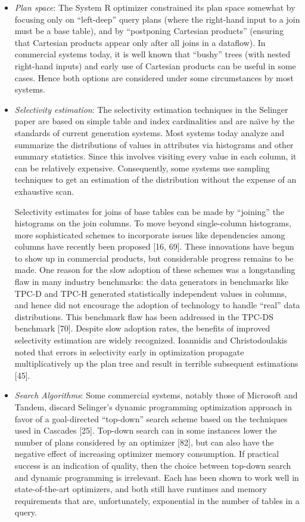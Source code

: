 \documentclass[b5paper,11pt,twoside,openright]{book}
\begin{document}
\begin{itemize}
\item
  \emph{Plan space}: The System R optimizer constrained its plan space
  somewhat by focusing only on ``left-deep'' query plans (where the
  right-hand input to a join must be a base table), and by ``postponing
  Cartesian products'' (ensuring that Cartesian products appear only
  after all joins in a dataflow). In commercial systems today, it is
  well known that ``bushy'' trees (with nested right-hand inputs) and
  early use of Cartesian products can be useful in some cases. Hence
  both options are considered under some circumstances by most systems.
\item
  \emph{Selectivity estimation}: The selectivity estimation techniques
  in the Selinger paper are based on simple table and index
  cardinalities and are na{\"\i}ve by the standards of current generation
  systems. Most systems today analyze and summarize the distributions of
  values in attributes via histograms and other summary statistics.
  Since this involves visiting every value in each column, it can be
  relatively expensive. Consequently, some systems use sampling
  techniques to get an estimation of the distribution without the
  expense of an exhaustive scan.

Selectivity estimates for joins of base tables can be made by
``joining'' the histograms on the join columns. To move beyond
single-column histograms, more sophisticated schemes to incorporate
issues like dependencies among columns have recently been proposed
{[}16, 69{]}. These innovations have begun to show up in commercial
products, but considerable progress remains to be made. One reason for
the slow adoption of these schemes was a longstanding flaw in many
industry benchmarks: the data generators in benchmarks like TPC-D and
TPC-H generated statistically independent values in columns, and hence
did not encourage the adoption of technology to handle ``real'' data
distributions. This benchmark flaw has been addressed in the TPC-DS
benchmark {[}70{]}. Despite slow adoption rates, the benefits of
improved selectivity estimation are widely recognized. Ioannidis and
Christodoulakis noted that errors in selectivity early in optimization
propagate multiplicatively up the plan tree and result in terrible
subsequent estimations {[}45{]}.

\item
  \emph{Search Algorithms}: Some commercial systems, notably those of
  Microsoft and Tandem, discard Selinger's dynamic programming
  optimization approach in favor of a goal-directed ``top-down'' search
  scheme based on the techniques used in Cascades {[}25{]}. Top-down
  search can in some instances lower the number of plans considered by
  an optimizer {[}82{]}, but can also have the negative effect of
  increasing optimizer memory consumption. If practical success is an
  indication of quality, then the choice between top-down search and
  dynamic programming is irrelevant. Each has been shown to work well in
  state-of-the-art optimizers, and both still have runtimes and memory
  requirements that are, unfortunately, exponential in the number of
  tables in a query.


\end{itemize}
\end{document}
